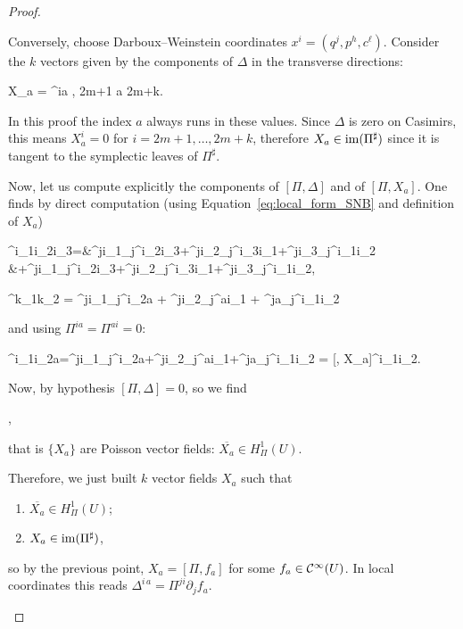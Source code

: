 \documentclass[main.tex]{subfiles}
\begin{document}
\begin{proof}
\begin{enumerate}
		Conversely, choose Darboux--Weinstein coordinates $x^i = (q^j, p^h, c^\ell)$. Consider the $k$ vectors given by the components of $\Delta$ in the transverse directions:
		\begin{eqalign}
			X_a = \Delta^{ia} , \quad 2m+1 \leq a \leq 2m+k.
		\end{eqalign}
		In this proof the index $a$ always runs in these values. Since $\Delta$ is zero on Casimirs, this means $X_a^{i} = 0$ for $i=2m+1,\ldots,2m+k$, therefore $X_a\in \operatorname{im}(\Pi^\sharp)$ since it is
		tangent to the symplectic leaves of $\Pi^\sharp$.

		Now, let us compute explicitly the components of $[\Pi, \Delta]$ and of $[\Pi, X_a]$.
		One finds by direct computation (using Equation~\eqref{eq:local_form_SNB} and definition of $X_a$)
		\begin{eqalign}
		 	[\Pi,\Delta]^{i_1i_2i_3}=&\Pi^{ji_1}\partial_j\Delta^{i_2i_3}+\Pi^{ji_2}\partial_j\Delta^{i_3i_1}+\Pi^{ji_3}\partial_j\Delta^{i_1i_2}\\
			&+\Delta^{ji_1}\partial_j\Pi^{i_2i_3}+\Delta^{ji_2}\partial_j\Pi^{i_3i_1}+\Delta^{ji_3}\partial_j\Pi^{i_1i_2},
		\end{eqalign}
		\begin{eqalign}
			[\Pi, X_a]^{k_1k_2} = \Pi^{ji_1}\partial_j\Delta^{i_2a} + \Pi^{ji_2}\partial_j\Delta^{ai_1} + \Delta^{ja}\partial_j\Pi^{i_1i_2}
		\end{eqalign}
		and using $\Pi^{ia}=\Pi^{ai}=0$:
		\begin{eqalign}
		 	[\Pi,\Delta]^{i_1i_2a}=\Pi^{ji_1}\partial_j\Delta^{i_2a}+\Pi^{ji_2}\partial_j\Delta^{ai_1}+\Delta^{ja}\partial_j\Pi^{i_1i_2} = [\Pi, X_a]^{i_1i_2}.
		\end{eqalign}
		Now, by hypothesis $[\Pi,\Delta]=0$, so we find
		\begin{eqalign}
			\Lie{X_a}\Pi=0,
		\end{eqalign}
		that is $\{X_a\}$ are Poisson vector fields: $\overline{X_a}\in H^1_\Pi(U)$.

		Therefore, we just built $k$ vector fields $X_a$ such that
		\begin{enumerate}
			\item $\overline{X_a}\in H^1_\Pi(U)$;
			\item $X_a\in\operatorname{im}(\Pi^\sharp)$,
		\end{enumerate}
		so by the previous point, $X_a = [\Pi, f_a]$ for some $f_a \in \mathcal{C}^\infty(U)$.
		In local coordinates this reads $\Delta^{i\,a} = \Pi^{ji}\partial_j f_a$.
		

\end{enumerate}
\end{proof}
\end{document}
